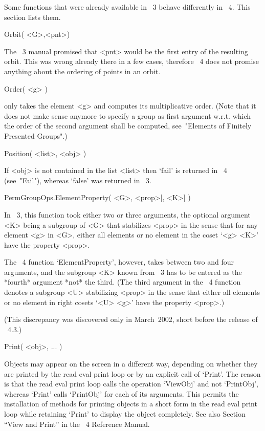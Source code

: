 
Some functions that were already available in {\GAP}~3  behave
differently in {\GAP}~4.  This section lists them.

\>Orbit( <G>,<pnt>)

The {\GAP}~3 manual promised that <pnt> would be the first entry of the
resulting orbit. This was wrong already there in a few cases, therefore
{\GAP}~4 does not promise anything about the ordering of points in an orbit.

\>Order( <g> )

only takes the element <g> and computes its multiplicative order.
(Note that it does not make sense anymore to specify a group as
first argument w.r.t. which the order of the second argument shall
be computed, see~"Elements of Finitely Presented Groups".)

\>Position( <list>, <obj> )

If <obj> is not contained in the list <list> then `fail' is returned
in {\GAP}~4 (see~"Fail"), whereas `false' was returned in {\GAP}~3.


\>PermGroupOps.ElementProperty( <G>, <prop>[, <K>] )

In {\GAP}~3, this function took either two or three arguments,
the optional argument <K> being a subgroup of <G> that stabilizes <prop>
in the sense that for any element <g> in <G>,
either all elements or no element in the coset `<g> \* <K>' have the
property <prop>.

The {\GAP}~4 function `ElementProperty', however,
takes between two and four arguments,
and the subgroup <K> known from {\GAP}~3 has to be entered as the *fourth*
argument *not* the third.
(The third argument in the {\GAP}~4 function denotes a subgroup <U>
stabilizing <prop> in the sense that either all elements or no element
in right cosets `<U> \* <g>' have the property <prop>.)

(This discrepancy was discovered only in March~2002,
short before the release of {\GAP}~4.3.)


\>Print( <obj>, ... )

Objects may appear on the screen in a different way,
depending on whether they are printed by the read eval print loop
or by an explicit call of `Print'.
The reason is that the read eval print loop calls the operation `ViewObj'
and not `PrintObj', whereas `Print' calls `PrintObj' for each of its
arguments.
This permits the installation of methods for printing objects in a short form
in the read eval print loop while retaining `Print' to display
the object completely.
See also Section ``View and Print'' in the {\GAP}~4 Reference Manual.

